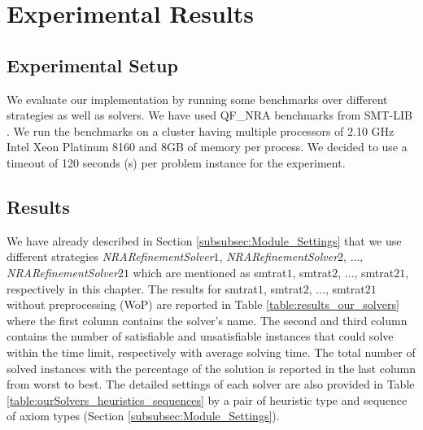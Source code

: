\chapter{Experimental Results}
\label{chap:experimental_result}

\section{Experimental Setup}
We evaluate our implementation by running some benchmarks over different strategies as well as solvers.
We have used QF\_NRA benchmarks \cite{SMTLIB-benchmarks} from SMT-LIB \cite{BarFT-SMTLIB}.
We run the benchmarks on a cluster having multiple processors of 2.10 GHz Intel Xeon Platinum 8160 and 8GB of memory per process.
We decided to use a timeout of 120 seconds (s) per problem instance for the experiment.

\section{Results}
\begin{sloppypar}
We have already described in Section \ref{subsubsec:Module_Settings} that we use different strategies \textit{NRARefinementSolver$1$}, \textit{NRARefinementSolver$2$}, $\dots$, \textit{NRARefinementSolver$21$} which are mentioned as  smtrat$1$, smtrat$2$, $\dots$, smtrat$21$, respectively in this chapter. 
The results for smtrat$1$, smtrat$2$, $\dots$, smtrat$21$ without preprocessing (WoP) are reported in Table \ref{table:results_our_solvers} where the first column contains the solver's name.
The second and third column contains the number of satisfiable and unsatisfiable instances that could solve within the time limit, respectively with average solving time.
The total number of solved instances with the percentage of the solution is reported in the last column from worst to best.
The detailed settings of each solver are also provided in Table \ref{table:ourSolvers_heuristics_sequences} by a pair of heuristic type and sequence of axiom types (Section \ref{subsubsec:Module_Settings}).\newline
\end{sloppypar}

